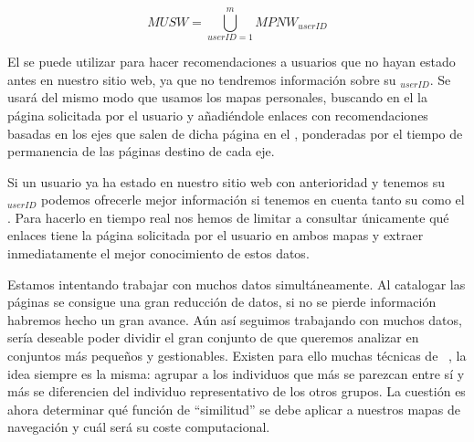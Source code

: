 \begin{defn}\label{def:1-3-1-MUSW}
  \begin{equation}\label{eq:1-3-1-MUSW}
    MUSW = \bigcup_{userID=1}^{m}{MPNW_{userID}} 
  \end{equation}
\end{defn}

El \MUSW se puede utilizar para hacer recomendaciones a usuarios que no hayan estado antes en nuestro sitio web, ya que no tendremos información sobre su \MPNW$_{userID}$. Se usará del mismo modo que usamos los mapas personales, buscando en el \grafo la página solicitada por el usuario y añadiéndole enlaces con recomendaciones basadas en los ejes que salen de dicha página en el \grafo, ponderadas por el tiempo de permanencia de las páginas destino de cada eje.

Si un usuario ya ha estado en nuestro sitio web con anterioridad y tenemos su \MPNW$_{userID}$ podemos ofrecerle mejor información si tenemos en cuenta tanto su \MPNW como el \MUSW. Para hacerlo en tiempo real nos hemos de limitar a consultar únicamente qué enlaces tiene la página solicitada por el usuario en ambos mapas y extraer inmediatamente el mejor conocimiento de estos datos. 

Estamos intentando trabajar con muchos datos simultáneamente. Al catalogar las páginas se consigue una gran reducción de datos, si no se pierde información habremos hecho un gran avance. Aún así seguimos trabajando con muchos datos, sería deseable poder dividir el gran conjunto de \grafos que queremos analizar en conjuntos más pequeños y gestionables. Existen para ello muchas técnicas de \clustering~\citep{NgHan-EfficientAndEffectiveClusteringMethods-1994}, la idea siempre es la misma: agrupar a los individuos que más se parezcan entre sí y más se diferencien del individuo representativo de los otros grupos. La cuestión es ahora determinar qué función de "`similitud"' se debe aplicar a nuestros mapas de navegación y cuál será su coste computacional.

